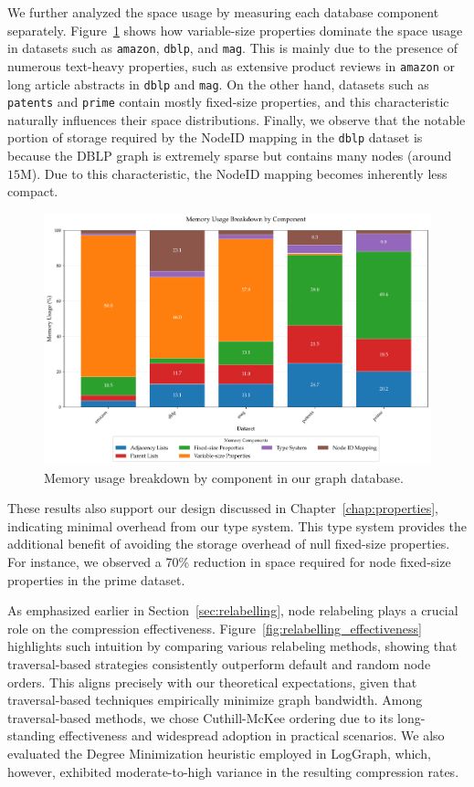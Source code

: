 We further analyzed the space usage by measuring each database component separately. Figure~\ref{fig:space_breakdown} shows how variable-size properties dominate the space usage in datasets such as \verb^amazon^, \verb^dblp^, and \verb^mag^. This is mainly due to the presence of numerous text-heavy properties, such as extensive product reviews in \verb^amazon^ or long article abstracts in \verb^dblp^ and \verb^mag^. On the other hand, datasets such as \verb^patents^ and \verb^prime^ contain mostly fixed-size properties, and this characteristic naturally influences their space distributions. Finally, we observe that the notable portion of storage required by the NodeID mapping in the \verb^dblp^ dataset is because the DBLP graph is extremely sparse but contains many nodes (around $15$M). Due to this characteristic, the NodeID mapping becomes inherently less compact.
\begin{figure}[htbp]
  \centering
  \includegraphics[width=\linewidth]{plots/graph_db_memory_breakdown.pdf}
  \caption{Memory usage breakdown by component in our graph database.}
  \label{fig:space_breakdown}
\end{figure}
\FloatBarrier

These results also support our design discussed in Chapter~\ref{chap:properties}, indicating minimal overhead from our type system. This type system provides the additional benefit of avoiding the storage overhead of null fixed-size properties. For instance, we observed a 70\% reduction in space required for node fixed-size properties in the prime dataset.



As emphasized earlier in Section~\ref{sec:relabelling}, node relabeling plays a crucial role on the compression effectiveness. Figure~\ref{fig:relabelling_effectiveness} highlights such intuition by comparing various relabeling methods, showing that traversal-based strategies consistently outperform default and random node orders. This aligns precisely with our theoretical expectations, given that traversal-based techniques empirically minimize graph bandwidth. Among traversal-based methods, we chose Cuthill-McKee ordering due to its long-standing effectiveness and widespread adoption in practical scenarios. We also evaluated the Degree Minimization heuristic employed in LogGraph, which, however, exhibited moderate-to-high variance in the resulting compression rates.

